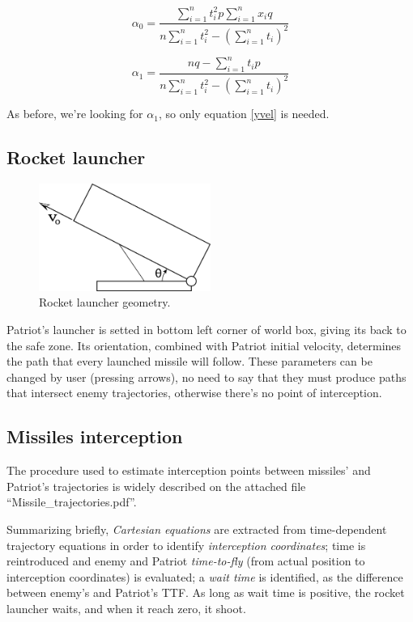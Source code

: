 \documentclass[notitlepage,a4paper,11pt]{article} %
\begin{document}
			\begin{equation}
					\alpha_0 = \frac
					{\sum_{i=1}^n t_i^2 p \sum_{i=1}^n x_i q}{n \sum_{i=1}^n t_i^2 - (\sum_{i=1}^n t_i)^2}
			\end{equation}

			\begin{equation} \label{yvel}
					\alpha_1 = \frac
					{n q - \sum_{i=1}^n t_i p}{n \sum_{i=1}^n t_i^2 - (\sum_{i=1}^n t_i)^2}
			\end{equation}

			As before, we're looking for $\alpha_1$, so only equation \eqref{yvel} is needed.

	\newpage
	\subsection{Rocket launcher}

		\begin{figure}[htb]
		\centering \includegraphics[width=0.5\textwidth]{launcher}
			\caption{Rocket launcher geometry.}
		\end{figure}

		Patriot's launcher is setted in bottom left corner of world box, giving its back to the safe zone.
		Its orientation, combined with Patriot initial velocity, determines the path that every launched missile 
		 will follow.
		These parameters can be changed by user (pressing arrows), no need to say that they must produce paths that intersect enemy trajectories, otherwise there's no point of interception.

	\subsection{Missiles interception}

		The procedure used to estimate interception points between missiles' and Patriot's trajectories is widely described on the attached file \mbox{``Missile\_trajectories.pdf''}.

		Summarizing briefly, \emph{Cartesian equations} are extracted from time-dependent trajectory equations in order to identify \emph{interception coordinates}; time is reintroduced and enemy and Patriot \emph{time-to-fly} (from actual position to interception coordinates) is evaluated; a \emph{wait time} is identified, as the difference between enemy's and Patriot's TTF. As long as wait time is positive, the rocket launcher waits, and when it reach zero, it shoot.
\end{document}
